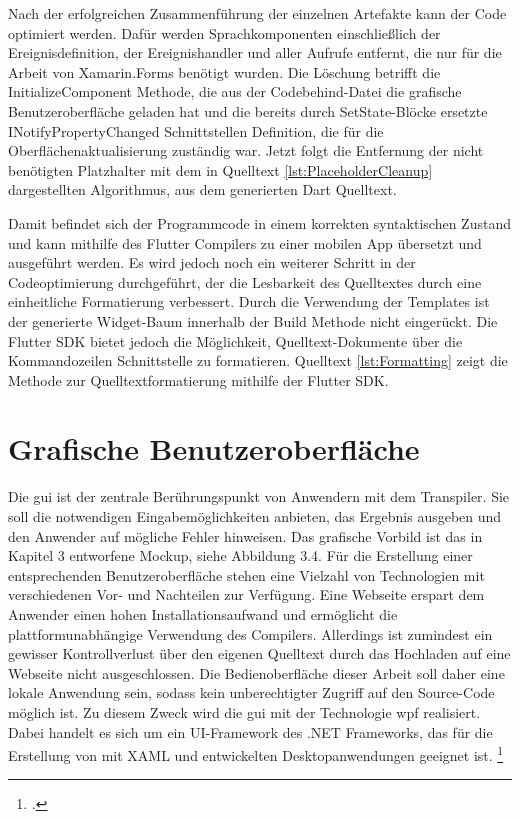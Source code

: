 Nach der erfolgreichen Zusammenführung der einzelnen Artefakte kann der Code optimiert werden. Dafür werden Sprachkomponenten einschließlich der Ereignisdefinition,  der Ereignishandler und aller Aufrufe entfernt, die  nur für die  Arbeit von Xamarin.Forms benötigt  wurden. Die Löschung betrifft die \glq InitializeComponent\grq{}  Methode, die aus der Codebehind-Datei die grafische Benutzeroberfläche geladen hat und die bereits durch SetState-Blöcke ersetzte
 \glq INotifyPropertyChanged\grq{}  Schnittstellen Definition,  die für die Oberflächenaktualisierung zuständig war.  Jetzt folgt die Entfernung der nicht benötigten Platzhalter mit dem in Quelltext \ref{lst:PlaceholderCleanup} dargestellten Algorithmus,  aus dem generierten Dart Quelltext.  

Damit befindet sich der Programmcode in einem korrekten syntaktischen Zustand und kann mithilfe des Flutter Compilers zu einer mobilen App übersetzt und ausgeführt werden.  Es wird jedoch noch ein weiterer Schritt in der Codeoptimierung durchgeführt,  der die Lesbarkeit des Quelltextes durch eine einheitliche Formatierung verbessert.  Durch die Verwendung der Templates ist der generierte  Widget-Baum innerhalb der Build Methode nicht eingerückt.  Die Flutter SDK bietet jedoch die Möglichkeit,  Quelltext-Dokumente über die Kommandozeilen Schnittstelle zu formatieren.  Quelltext \ref{lst:Formatting} zeigt die Methode zur Quelltextformatierung mithilfe der Flutter SDK. 

 


\section{Grafische Benutzeroberfläche}
Die \ac{gui} ist der zentrale Berührungspunkt von Anwendern mit dem Transpiler.  Sie soll die notwendigen Eingabemöglichkeiten anbieten, das Ergebnis ausgeben und den Anwender auf mögliche Fehler hinweisen.  Das grafische Vorbild ist das in Kapitel 3 entworfene Mockup, siehe Abbildung 3.4.  Für die Erstellung einer entsprechenden Benutzeroberfläche stehen eine Vielzahl von Technologien mit verschiedenen Vor- und Nachteilen zur Verfügung.  Eine Webseite erspart dem Anwender einen hohen Installationsaufwand und ermöglicht die plattformunabhängige Verwendung des Compilers.  Allerdings ist zumindest ein gewisser Kontrollverlust über den eigenen Quelltext durch das  Hochladen auf eine Webseite nicht ausgeschlossen.  Die Bedienoberfläche dieser Arbeit soll daher eine lokale Anwendung sein, sodass kein  unberechtigter Zugriff auf den Source-Code möglich ist.  Zu diesem Zweck wird die \ac{gui}  mit der Technologie \ac{wpf} realisiert.  Dabei handelt es sich um ein UI-Framework des .NET Frameworks, das für die Erstellung von mit XAML und \Csharp{} entwickelten Desktopanwendungen geeignet ist. \footcite[Vgl.][S. 1f]{Wenger2012} 

